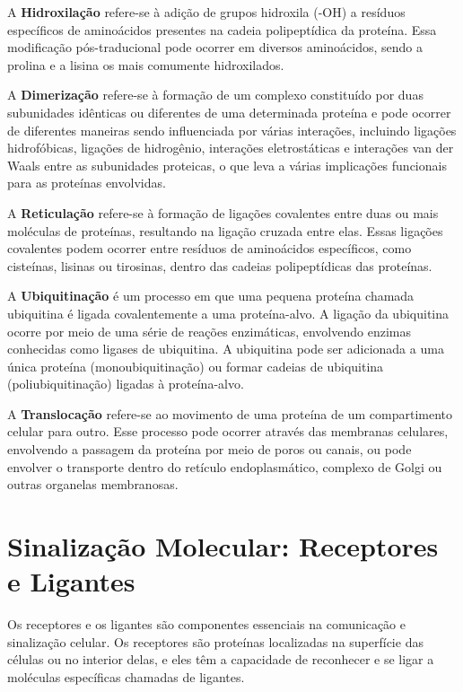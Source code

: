 \documentclass[11pt,a4paper]{article}
\begin{document}
		A \textcolor{CarnationPink}{\textbf{Hidroxilação}} refere-se à adição de grupos hidroxila (-OH) a resíduos específicos de aminoácidos presentes na cadeia polipeptídica da proteína. Essa modificação pós-traducional pode ocorrer em diversos aminoácidos, sendo a prolina e a lisina os mais comumente hidroxilados.

		A \textcolor{CarnationPink}{\textbf{Dimerização}} refere-se à formação de um complexo constituído por duas subunidades idênticas ou diferentes de uma determinada proteína e pode ocorrer de diferentes maneiras sendo influenciada por várias interações, incluindo ligações hidrofóbicas, ligações de hidrogênio, interações eletrostáticas e interações van der Waals entre as subunidades proteicas, o que leva a várias implicações funcionais para as proteínas envolvidas.

		A \textcolor{CarnationPink}{\textbf{Reticulação}} refere-se à formação de ligações covalentes entre duas ou mais moléculas de proteínas, resultando na ligação cruzada entre elas. Essas ligações covalentes podem ocorrer entre resíduos de aminoácidos específicos, como cisteínas, lisinas ou tirosinas, dentro das cadeias polipeptídicas das proteínas. 

		A \textcolor{CarnationPink}{\textbf{Ubiquitinação}} é um processo em que uma pequena proteína chamada ubiquitina é ligada covalentemente a uma proteína-alvo. A ligação da ubiquitina ocorre por meio de uma série de reações enzimáticas, envolvendo enzimas conhecidas como ligases de ubiquitina. A ubiquitina pode ser adicionada a uma única proteína (monoubiquitinação) ou formar cadeias de ubiquitina (poliubiquitinação) ligadas à proteína-alvo. 

		A \textcolor{CarnationPink}{\textbf{Translocação}} refere-se ao movimento de uma proteína de um compartimento celular para outro. Esse processo pode ocorrer através das membranas celulares, envolvendo a passagem da proteína por meio de poros ou canais, ou pode envolver o transporte dentro do retículo endoplasmático, complexo de Golgi ou outras organelas membranosas.

	\section{Sinalização Molecular: Receptores e Ligantes}

		Os receptores e os ligantes são componentes essenciais na comunicação e sinalização celular. Os receptores são proteínas localizadas na superfície das células ou no interior delas, e eles têm a capacidade de reconhecer e se ligar a moléculas específicas chamadas de ligantes.
\end{document}

